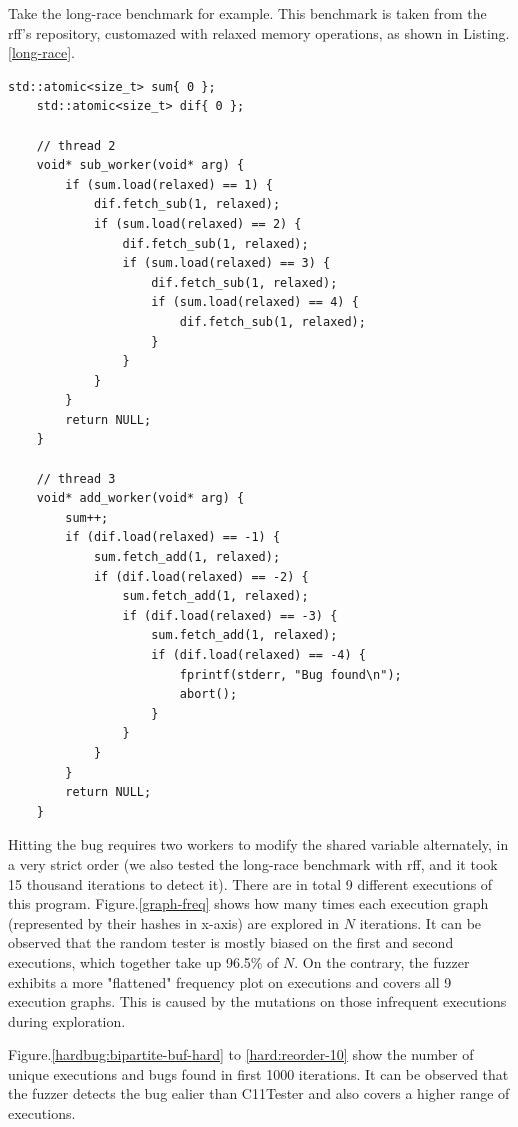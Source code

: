 Take the long-race benchmark for example. This benchmark is taken from the rff's repository, customazed with relaxed memory operations, as shown in Listing. \ref{long-race}.

\begin{lstlisting}[caption={long-race}, label={long-race}]
	std::atomic<size_t> sum{ 0 };
	std::atomic<size_t> dif{ 0 };
	
	// thread 2
	void* sub_worker(void* arg) {
		if (sum.load(relaxed) == 1) {
			dif.fetch_sub(1, relaxed);
			if (sum.load(relaxed) == 2) {
				dif.fetch_sub(1, relaxed);
				if (sum.load(relaxed) == 3) {
					dif.fetch_sub(1, relaxed);
					if (sum.load(relaxed) == 4) {
						dif.fetch_sub(1, relaxed);
					}
				}
			}
		}
		return NULL;
	}
	
	// thread 3
	void* add_worker(void* arg)	{
		sum++;
		if (dif.load(relaxed) == -1) {
			sum.fetch_add(1, relaxed);
			if (dif.load(relaxed) == -2) {
				sum.fetch_add(1, relaxed);
				if (dif.load(relaxed) == -3) {
					sum.fetch_add(1, relaxed);
					if (dif.load(relaxed) == -4) {
						fprintf(stderr, "Bug found\n");
						abort();
					}
				}
			}
		}
		return NULL;
	}
\end{lstlisting}

Hitting the bug requires two workers to modify the shared variable alternately, in a very strict order (we also tested the long-race benchmark with rff, and it took 15 thousand iterations to detect it). There are in total 9 different executions of this program. Figure.\ref{graph-freq} shows how many times each execution graph (represented by their hashes in x-axis) are explored in $N$ iterations. It can be observed that the random tester is mostly biased on the first and second executions, which together take up 96.5\% of $N$. On the contrary, the fuzzer exhibits a more "flattened" frequency plot on executions and covers all 9 execution graphs. This is caused by the mutations on those infrequent executions during exploration. 

Figure.\ref{hardbug:bipartite-buf-hard} to \ref{hard:reorder-10} show the number of unique executions and bugs found in first 1000 iterations. It can be observed that the fuzzer detects the bug ealier than C11Tester and also covers a higher range of executions.

